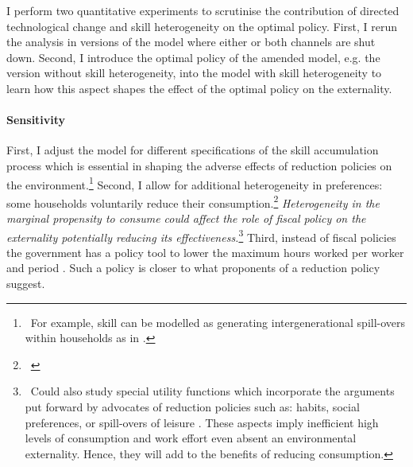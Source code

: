 
I perform two quantitative experiments to scrutinise the contribution of directed technological change and skill heterogeneity on the optimal policy. First, I rerun the analysis in versions of the model where either or both channels are shut down.  Second, I introduce the optimal policy of the amended model, e.g. the  version without skill heterogeneity, into the model with skill heterogeneity to learn how this aspect shapes the effect of the optimal policy on the externality. %

\paragraph{Sensitivity}
First, I adjust the model for different specifications of the skill accumulation process which is essential in shaping the adverse effects of reduction policies on the environment.\footnote{\ For example, skill can be modelled as generating intergenerational spill-overs within households as in \cite{Borissov2019CarbonDevelopment}.} Second, I allow for additional heterogeneity in preferences: some households voluntarily reduce their consumption.\footnote{\ } \textit{Heterogeneity in the marginal propensity to consume could affect the role of fiscal policy on the externality potentially reducing its effectiveness.}\footnote{\ Could also study special utility functions which incorporate the arguments put forward by advocates of reduction policies such as: habits, social preferences, or  spill-overs of leisure \citep[][\textit{to be read}]{Alesina2005WorkDifferent}. These aspects imply inefficient high levels of consumption and work effort even absent an environmental externality.  Hence, they will add to the benefits of reducing consumption. 
}
Third, instead of fiscal policies the government has a policy tool to lower the maximum hours worked per worker and period \citep[\textit{compare}][]{Alvarez-Cuadrado2007EnvyHours}. Such a policy is closer to what proponents of a reduction policy suggest. %
\\

